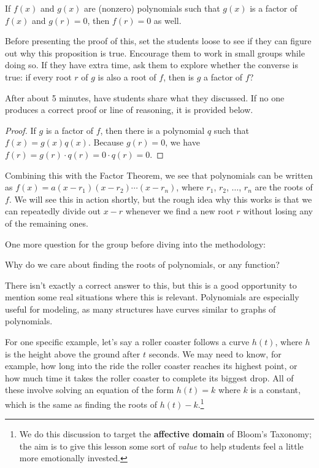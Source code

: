 \begin{proposition}
    If $f(x)$ and $g(x)$ are (nonzero) polynomials such that $g(x)$ is a factor of $f(x)$ and $g(r) = 0$, then $f(r) = 0$ as well.
\end{proposition}

Before presenting the proof of this, set the students loose to see if they can figure out why this proposition is true. Encourage them to work in small groups while doing so. If they have extra time, ask them to explore whether the converse is true: if every root $r$ of $g$ is also a root of $f$, then is $g$ a factor of $f$?

After about 5 minutes, have students share what they discussed. If no one produces a correct proof or line of reasoning, it is provided below.

\begin{proof}
    If $g$ is a factor of $f$, then there is a polynomial $q$ such that $f(x) = g(x) q(x)$. Because $g(r)= 0$, we have $f(r) = g(r)\cdot q(r) = 0\cdot q(r) = 0$.
\end{proof}

Combining this with the Factor Theorem, we see that polynomials can be written as $f(x) = a(x-r_1)(x-r_2)\cdots (x-r_n)$, where $r_1$, $r_2$, $\dots$, $r_n$ are the roots of $f$. We will see this in action shortly, but the rough idea why this works is that we can repeatedly divide out $x-r$ whenever we find a new root $r$ without losing any of the remaining ones.

One more question for the group before diving into the methodology:

\begin{ques}
    Why do we care about finding the roots of polynomials, or any function?
\end{ques}

There isn't exactly a correct answer to this, but this is a good opportunity to mention some real situations where this is relevant. Polynomials are especially useful for modeling, as many structures have curves similar to graphs of polynomials. 

For one specific example, let's say a roller coaster follows a curve $h(t)$, where $h$ is the height above the ground after $t$ seconds. We may need to know, for example, how long into the ride the roller coaster reaches its highest point, or how much time it takes the roller coaster to complete its biggest drop. All of these involve solving an equation of the form $h(t) = k$ where $k$ is a constant, which is the same as finding the roots of $h(t)-k$.\footnote{We do this discussion to target the \textbf{affective domain} of Bloom's Taxonomy; the aim is to give this lesson some sort of \emph{value} to help students feel a little more emotionally invested.}



